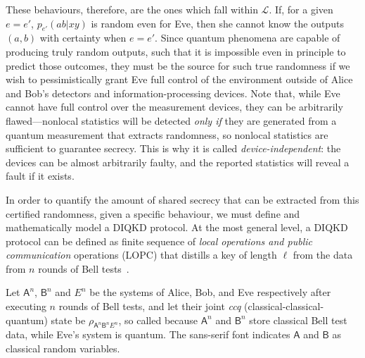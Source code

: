 \documentclass[10pt, a4paper]{article}
\numberwithin{equation}{section} %
\theoremstyle{definition}
\theoremstyle{plain}
\newcommand{\?}{\mathrel{?}} %
\newcommand{\crv}[1]{\mathsf{#1}}
\newcommand{\Ls}{\mathcal{L}}
\begin{document}
    These behaviours, therefore, are the ones which fall within \(\Ls\). If, for a given \(e = e'\), \(p_{e'}(ab|xy)\) is random even for Eve, then she cannot know the outputs \((a,b)\) with certainty when \(e=e'\). Since quantum phenomena are capable of producing truly random outputs, such that it is impossible even in principle to predict those outcomes, they must be the source for such true randomness if we wish to pessimistically grant Eve full control of the environment outside of Alice and Bob's detectors and information-processing devices. Note that, while Eve cannot have full control over the measurement devices, they can be arbitrarily flawed---nonlocal statistics will be detected \emph{only if} they are generated from a quantum measurement that extracts randomness, so nonlocal statistics are sufficient to guarantee secrecy. This is why it is called \emph{device-independent}: the devices can be almost arbitrarily faulty, and the reported statistics will reveal a fault if it exists.

    In order to quantify the amount of shared secrecy that can be extracted from this certified randomness, given a specific behaviour, we must define and mathematically model a DIQKD protocol. At the most general level, a DIQKD protocol can be defined as finite sequence of \emph{local operations and public communication} operations (LOPC) that distills a key of length \(\ell\) from the data from \(n\) rounds of Bell tests~\cite{DIQKD_Limits}.

    Let \(\crv{A}^n\), \(\crv{B}^n\) and \(E^n\) be the systems of Alice, Bob, and Eve respectively after executing \(n\) rounds of Bell tests, and let their joint \emph{ccq} (classical-classical-quantum) state be \(\rho_{\crv{A}^n \crv{B}^n E^n}\), so called because \(\crv{A}^n\) and \(\crv{B}^n\) store classical Bell test data, while Eve's system is quantum. The sans-serif font indicates \(\crv{A}\) and \(\crv{B}\) as classical random variables.
\end{document}

